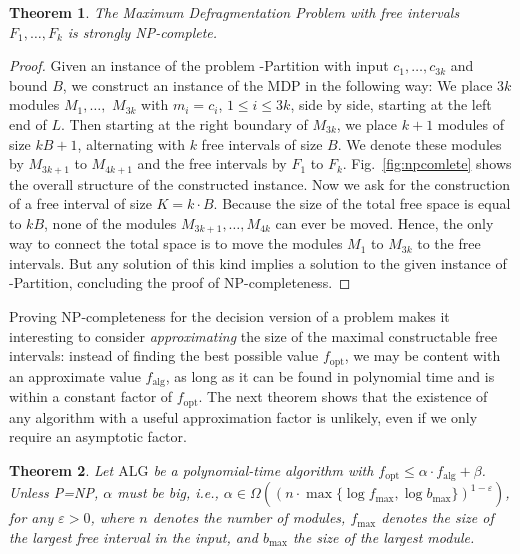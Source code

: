 \documentclass{article}
\newcommand{\NP}{NP}
\newcommand{\POL}{P}
\def\fmax{f_{\mathrm{max}}}
\def\bmax{b_{\mathrm{max}}}
\def\falg{f_{\mathrm{alg}}}
\def\fopt{f_{\mathrm{opt}}}
\def\alg{\mathrm{ALG}}
\newtheorem{thm}{Theorem}
\begin{document}
\begin{thm}
The Maximum Defragmentation Problem with free intervals $F_1,\ldots,
F_k$ is strongly \NP-complete.
\end{thm}

\begin{proof}
Given an instance of the problem {-Partition} with input
$c_1,\ldots,c_{3k}$ and bound $B$, we construct an instance of the
MDP in the following way: We place $3k$
modules $M_1,\ldots,$ $M_{3k}$ with $m_i=c_i$, $1\leq i \leq 3k$, side
by side, starting at the left end of $L$. Then starting at the right
boundary of $M_{3k}$, we place $k+1$ modules of size
$kB+1$, alternating with $k$ free intervals of size $B$. We denote 
these modules by
$M_{3k+1}$ to $M_{4k+1}$ and the free intervals by $F_1$ to $F_k$. 
Fig.~\ref{fig:npcomlete} shows the overall structure of the constructed
instance. Now we ask for the construction of a free interval of size
$K=k\cdot B$. Because the size of the total free space is equal to $kB$,
none of the modules $M_{3k+1},\ldots,M_{4k}$ can ever be moved.
Hence, the only way to connect the total space is to move the
modules $M_1$ to $M_{3k}$ to the free intervals. But any solution of
this kind implies a solution to the given instance of {-Partition}, concluding the proof of NP-completeness.
\end{proof}

Proving \NP-completeness for the decision version of a problem 
makes it interesting to consider {\em approximating} the size of the maximal
constructable free intervals: instead of finding the best possible value
$\fopt$, we may be content with an approximate value $\falg$, as long as it
can be found in polynomial time and is within a constant factor of $\fopt$.
The next theorem
shows that the existence of any algorithm with a useful approximation
factor is unlikely, even if we only require an asymptotic factor.

\begin{thm}
\label{th:2}
Let $\alg$ be a polynomial-time algorithm with $\fopt \leq \alpha
\cdot \falg + \beta$. Unless \POL=\NP, $\alpha$ must be big, i.e.,
$\alpha \in \Omega( (n\cdot\max\{\log\fmax,\log\bmax\})^{1-\varepsilon} )$, for any
$\varepsilon > 0$, 
where $n$ denotes the number of modules, $\fmax$ denotes the size of the largest free interval in the input, 
and $\bmax$ the size of the largest module.
\end{thm}
\end{document}
